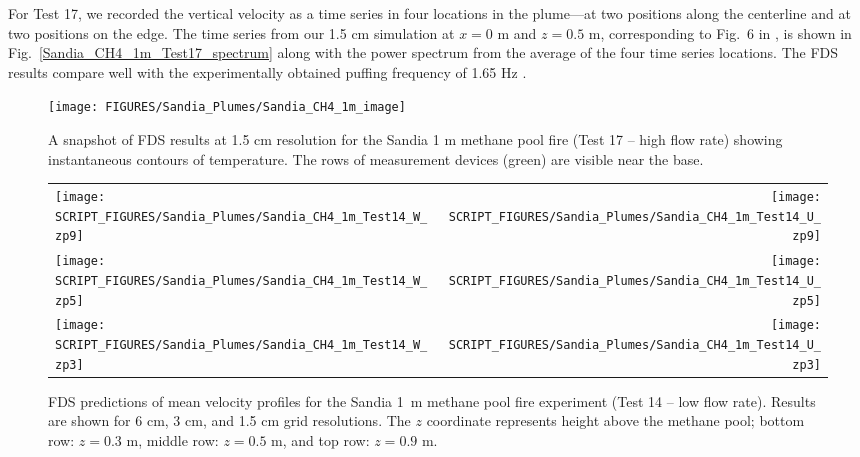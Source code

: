 For Test 17, we recorded the vertical velocity as a time series in four locations in the plume---at two positions along the centerline and at two positions on the edge.  The time series from our 1.5 cm simulation at $x=0$ m and $z=0.5$ m, corresponding to Fig.~6 in \cite{Tieszen:2002}, is shown in Fig.~\ref{Sandia_CH4_1m_Test17_spectrum} along with the power spectrum from the average of the four time series locations.  The FDS results compare well with the experimentally obtained puffing frequency of 1.65 Hz \cite{Tieszen:2002}.

\begin{figure}[h]
\begin{center}
\texttt{[image: FIGURES/Sandia\_Plumes/Sandia\_CH4\_1m\_image]}
\caption[Sandia 1~m methane pool fire instantaneous temperature contours]{A snapshot of FDS results at 1.5 cm resolution for the Sandia 1 m methane pool fire (Test 17 -- high flow rate) showing instantaneous contours of temperature.  The rows of measurement devices (green) are visible near the base.}
\label{Sandia_CH4_1m_image}
\end{center}
\end{figure}

\newpage

\begin{figure}[p]
\begin{tabular*}{\textwidth}{l@{\extracolsep{\fill}}r}
\texttt{[image: SCRIPT\_FIGURES/Sandia\_Plumes/Sandia\_CH4\_1m\_Test14\_W\_zp9]} &
\texttt{[image: SCRIPT\_FIGURES/Sandia\_Plumes/Sandia\_CH4\_1m\_Test14\_U\_zp9]} \\
\texttt{[image: SCRIPT\_FIGURES/Sandia\_Plumes/Sandia\_CH4\_1m\_Test14\_W\_zp5]} &
\texttt{[image: SCRIPT\_FIGURES/Sandia\_Plumes/Sandia\_CH4\_1m\_Test14\_U\_zp5]} \\
\texttt{[image: SCRIPT\_FIGURES/Sandia\_Plumes/Sandia\_CH4\_1m\_Test14\_W\_zp3]} &
\texttt{[image: SCRIPT\_FIGURES/Sandia\_Plumes/Sandia\_CH4\_1m\_Test14\_U\_zp3]}
\end{tabular*}
\caption[Sandia 1~m methane pool fire (Test 14) mean velocity profiles]
{FDS predictions of mean velocity profiles for the Sandia 1~m methane pool fire experiment (Test 14 -- low flow rate). Results are shown for 6 cm, 3 cm, and 1.5 cm grid resolutions. The $z$ coordinate represents height above the methane pool; bottom row: $z=0.3$ m, middle row: $z=0.5$ m, and top row: $z=0.9$ m.}
\label{Sandia_CH4_1m_Test14_velocity}
\end{figure}

